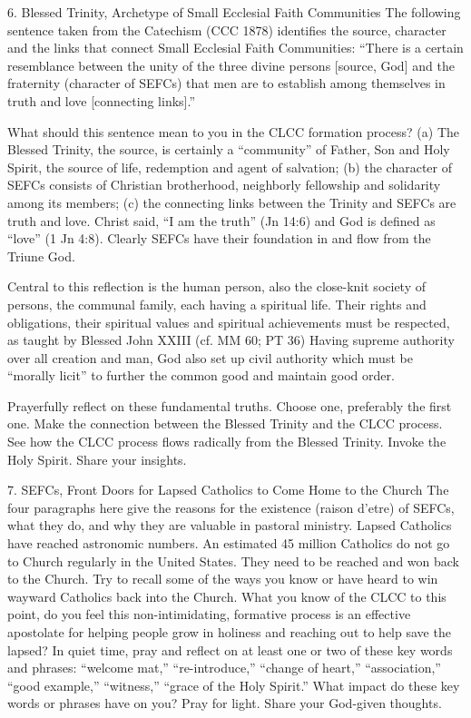 \documentclass[oneside]{book}
\begin{document}
6. Blessed Trinity, Archetype of Small Ecclesial Faith Communities
The following sentence taken from the Catechism (CCC 1878) identifies the
source, character and the links that connect Small Ecclesial Faith Communities:
``There is a certain resemblance between the unity of the three divine persons
[source, God] and the fraternity (character of SEFCs) that men are to establish
among themselves in truth and love [connecting links].''

What should this sentence mean to you in the CLCC formation process? (a) The
Blessed Trinity, the source, is certainly a ``community'' of Father, Son and
Holy Spirit, the source of life, redemption and agent of salvation; (b) the
character of SEFCs consists of Christian brotherhood, neighborly fellowship and
solidarity among its members; (c) the connecting links between the Trinity and
SEFCs are truth and love. Christ said, ``I am the truth'' (Jn 14:6) and God is
defined as ``love'' (1 Jn 4:8). Clearly SEFCs have their foundation in and flow
from the Triune God.

Central to this reflection is the human person, also the close-knit society of
persons, the communal family, each having a spiritual life. Their rights and
obligations, their spiritual values and spiritual achievements must be
respected, as taught by Blessed John XXIII (cf. MM 60; PT 36) Having supreme
authority over all creation and man, God also set up civil authority which must
be ``morally licit'' to further the common good and maintain good order.

Prayerfully reflect on these fundamental truths. Choose one, preferably the
first one. Make the connection between the Blessed Trinity and the CLCC
process. See how the CLCC process flows radically from the Blessed
Trinity. Invoke the Holy Spirit. Share your insights.

7. SEFCs, Front Doors for Lapsed Catholics to Come Home to the Church
The four paragraphs here give the reasons for the existence (raison d'etre) of
SEFCs, what they do, and why they are valuable in pastoral ministry. Lapsed
Catholics have reached astronomic numbers. An estimated 45 million Catholics do
not go to Church regularly in the United States. They need to be reached and won
back to the Church. Try to recall some of the ways you know or have heard to win
wayward Catholics back into the Church. What you know of the CLCC to this point,
do you feel this non-intimidating, formative process is an effective apostolate
for helping people grow in holiness and reaching out to help save the lapsed?
In quiet time, pray and reflect on at least one or two of these key words and
phrases: ``welcome mat,'' ``re-introduce,'' ``change of heart,''
``association,'' ``good example,'' ``witness,'' ``grace of the Holy Spirit.''
What impact do these key words or phrases have on you? Pray for light. Share
your God-given thoughts.
\end{document}
